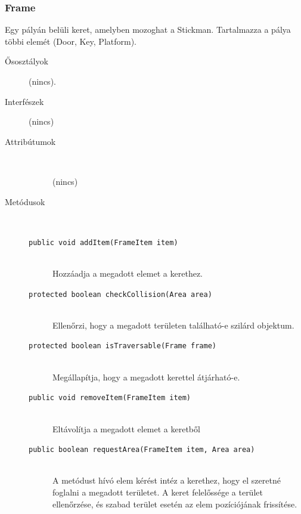 		\subsubsection{Frame}
				 Egy pályán belüli keret, amelyben mozoghat a Stickman. Tartalmazza a pálya többi elemét (Door, Key, Platform). 			\begin{description}


				\item[Ősosztályok] (nincs).
				\item[Interfészek] (nincs)
				\item[Attribútumok]$\ $
					\begin{description}
						\item[] (nincs)
					\end{description}
				\item[Metódusok]$\ $
					\begin{description}
						\item[\texttt{public void addItem(FrameItem item)}] \hfill \\ Hozzáadja a megadott elemet a kerethez. 
						\item[\texttt{protected boolean checkCollision(Area area)}] \hfill \\ Ellenőrzi, hogy a megadott területen  található-e szilárd objektum. 
						\item[\texttt{protected boolean isTraversable(Frame frame)}] \hfill \\ Megállapítja, hogy a megadott kerettel  átjárható-e. 
						\item[\texttt{public void removeItem(FrameItem item)}] \hfill \\ Eltávolítja a megadott elemet a keretből 
						\item[\texttt{public boolean requestArea(FrameItem item, Area area)}] \hfill \\ A metódust hívó elem kérést intéz a kerethez,  hogy el szeretné foglalni a megadott területet.  A keret felelőssége a terület ellenőrzése, és szabad  terület esetén az elem pozíciójának frissítése. 
					\end{description}
			\end{description}

